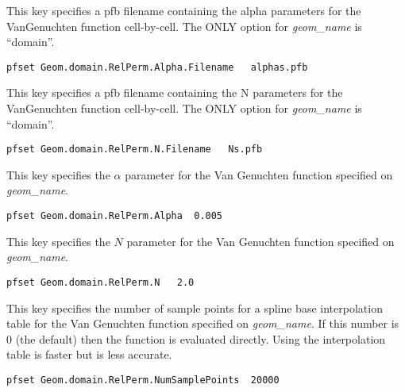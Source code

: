 {This key specifies a pfb filename containing the alpha parameters for the
VanGenuchten function cell-by-cell.  The ONLY option for {\em geom\_name} is
``domain''.}
\begin{display}\begin{verbatim}
pfset Geom.domain.RelPerm.Alpha.Filename   alphas.pfb
\end{verbatim}\end{display}

{This key specifies a pfb filename containing the N parameters for the
VanGenuchten function cell-by-cell.  The ONLY option for {\em geom\_name} is
``domain''.}
\begin{display}\begin{verbatim}
pfset Geom.domain.RelPerm.N.Filename   Ns.pfb
\end{verbatim}\end{display}

{This key specifies the $\alpha$ parameter for the Van Genuchten function
specified on {\em geom\_name}.
}
\begin{display}\begin{verbatim}
pfset Geom.domain.RelPerm.Alpha  0.005
\end{verbatim}\end{display}


{This key specifies the $N$ parameter for the Van Genuchten function specified
on {\em geom\_name}.
}
\begin{display}\begin{verbatim}
pfset Geom.domain.RelPerm.N   2.0
\end{verbatim}\end{display}

{This key specifies the number of sample points for a spline base interpolation table
for the Van Genuchten function specified on {\em geom\_name}.   If this number is 0 (the default) 
then the function is evaluated directly.   Using the interpolation table is faster but is less
accurate.
}
\begin{display}\begin{verbatim}
pfset Geom.domain.RelPerm.NumSamplePoints  20000
\end{verbatim}\end{display}

